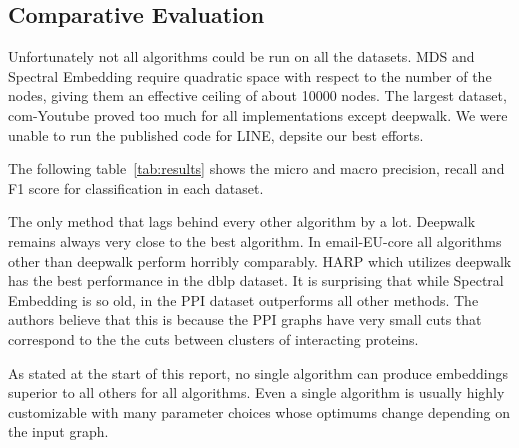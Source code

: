 \subsection{Comparative Evaluation}

Unfortunately not all algorithms could be run on all the datasets. MDS and Spectral Embedding
require quadratic space with respect to the number of the nodes, giving them an effective ceiling of
about 10000 nodes. The largest dataset, com-Youtube proved too much for all implementations except
deepwalk. We were unable to run the published code for LINE, depsite our best efforts.

The following table~\ref{tab:results} shows the micro and macro precision, recall and F1 score for
classification in each dataset.



The only method that lags behind every other algorithm by a lot. Deepwalk remains always very close
to the best algorithm. In email-EU-core all algorithms other than deepwalk perform horribly
comparably. HARP which utilizes deepwalk has the best performance in the dblp dataset. It is
surprising that while Spectral Embedding is so old, in the PPI dataset outperforms all other
methods. The authors believe that this is because the PPI graphs have very small cuts that
correspond to the the cuts between clusters of interacting proteins.

As stated at the start of this report, no single algorithm can produce embeddings superior to all
others for all algorithms. Even a single algorithm is usually highly customizable with many
parameter choices whose optimums change depending on the input graph.
